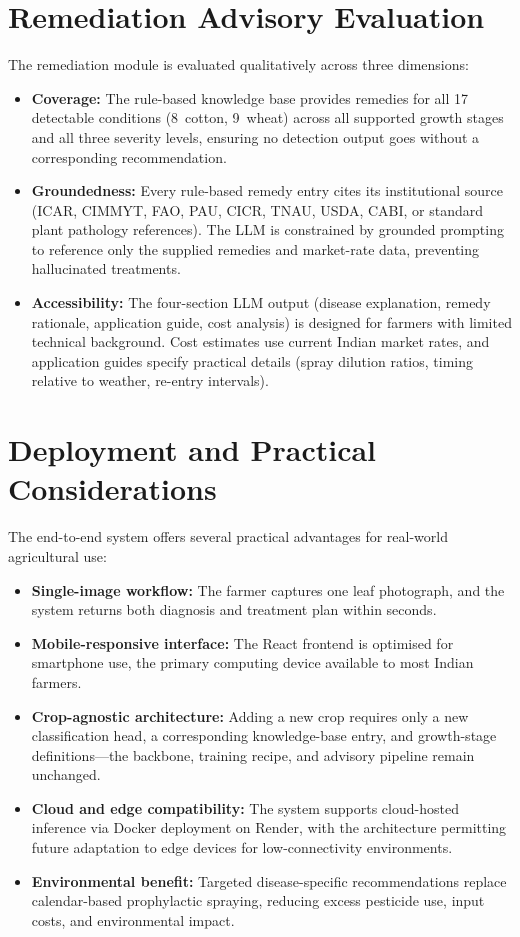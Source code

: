 \documentclass[12pt,a4paper]{report}
\begin{document}
\section{Remediation Advisory Evaluation}
The remediation module is evaluated qualitatively across three dimensions:

\begin{itemize}
    \item \textbf{Coverage:} The rule-based knowledge base provides remedies for all 17 detectable conditions (8~cotton, 9~wheat) across all supported growth stages and all three severity levels, ensuring no detection output goes without a corresponding recommendation.
    \item \textbf{Groundedness:} Every rule-based remedy entry cites its institutional source (ICAR, CIMMYT, FAO, PAU, CICR, TNAU, USDA, CABI, or standard plant pathology references). The LLM is constrained by grounded prompting to reference only the supplied remedies and market-rate data, preventing hallucinated treatments.
    \item \textbf{Accessibility:} The four-section LLM output (disease explanation, remedy rationale, application guide, cost analysis) is designed for farmers with limited technical background. Cost estimates use current Indian market rates, and application guides specify practical details (spray dilution ratios, timing relative to weather, re-entry intervals).
\end{itemize}

\section{Deployment and Practical Considerations}
The end-to-end system offers several practical advantages for real-world agricultural use:

\begin{itemize}
    \item \textbf{Single-image workflow:} The farmer captures one leaf photograph, and the system returns both diagnosis and treatment plan within seconds.
    \item \textbf{Mobile-responsive interface:} The React frontend is optimised for smartphone use, the primary computing device available to most Indian farmers.
    \item \textbf{Crop-agnostic architecture:} Adding a new crop requires only a new classification head, a corresponding knowledge-base entry, and growth-stage definitions---the backbone, training recipe, and advisory pipeline remain unchanged.
    \item \textbf{Cloud and edge compatibility:} The system supports cloud-hosted inference via Docker deployment on Render, with the architecture permitting future adaptation to edge devices for low-connectivity environments.
    \item \textbf{Environmental benefit:} Targeted disease-specific recommendations replace calendar-based prophylactic spraying, reducing excess pesticide use, input costs, and environmental impact.
\end{itemize}
\end{document}
